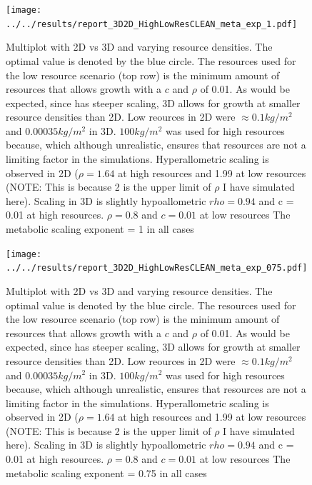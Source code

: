 \documentclass[a4paper, 11pt, hidelinks]{article} %
\begin{document}
	\begin{figure}[h!]
				
		\texttt{[image: ../../results/report\_3D2D\_HighLowResCLEAN\_meta\_exp\_1.pdf]}
		
		\caption{Multiplot with 2D vs 3D and varying resource densities. The optimal value is denoted by the blue circle.
		The resources used for the low resource scenario (top row) is the minimum amount of resources that allows growth with a $c$ and $\rho$ of 0.01.  As would be expected, since has steeper scaling, 3D allows for growth at smaller resource densities than 2D.
		Low reources in 2D were $ \approx 0.1kg/m^2 $ and $ 0.00035kg/m^2 $ in 3D.
		$ 100kg/m^2 $ was used for high resources because, which although unrealistic, ensures that resources are not a limiting factor in the simulations.
		Hyperallometric scaling is observed in 2D ($\rho = 1.64$ at high resources and 1.99 at low resources (NOTE: This is because 2 is the upper limit of $\rho$ I have simulated here). 
		Scaling in 3D is slightly hypoallometric $rho = 0.94$ and c = 0.01 at high resources. $\rho = 0.8$ and $c = 0.01$ at low resources
		The metabolic scaling exponent = 1 in all cases}
		\label{resources2D3D}
	\end{figure}

	\begin{figure}[h!]
		
		\texttt{[image: ../../results/report\_3D2D\_HighLowResCLEAN\_meta\_exp\_075.pdf]}
		
		\caption{Multiplot with 2D vs 3D and varying resource densities. The optimal value is denoted by the blue circle.
			The resources used for the low resource scenario (top row) is the minimum amount of resources that allows growth with a $c$ and $\rho$ of 0.01.  As would be expected, since has steeper scaling, 3D allows for growth at smaller resource densities than 2D.
			Low reources in 2D were $ \approx 0.1kg/m^2 $ and $ 0.00035kg/m^2 $ in 3D.
			$ 100kg/m^2 $ was used for high resources because, which although unrealistic, ensures that resources are not a limiting factor in the simulations.
			Hyperallometric scaling is observed in 2D ($\rho = 1.64$ at high resources and 1.99 at low resources (NOTE: This is because 2 is the upper limit of $\rho$ I have simulated here). 
			Scaling in 3D is slightly hypoallometric $rho = 0.94$ and c = 0.01 at high resources. $\rho = 0.8$ and $c = 0.01$ at low resources
			The metabolic scaling exponent = 0.75 in all cases}
		\label{resources2D3D}
	\end{figure}
	
\end{document}
